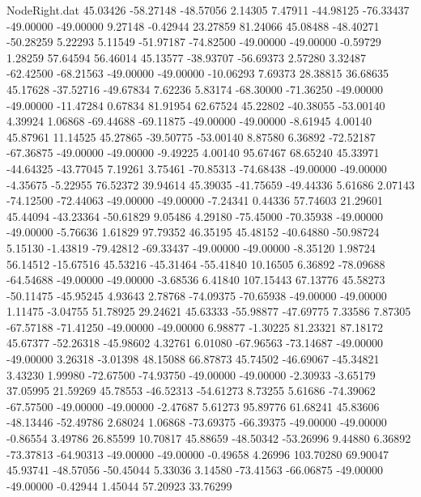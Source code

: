 \begin{filecontents}{NodeRight.dat}
  45.03426  -58.27148  -48.57056     2.14305    7.47911  -44.98125  -76.33437  -49.00000  -49.00000    9.27148   -0.42944   23.27859   81.24066
  45.08488  -48.40271  -50.28259     5.22293    5.11549  -51.97187  -74.82500  -49.00000  -49.00000   -0.59729    1.28259   57.64594   56.46014
  45.13577  -38.93707  -56.69373     2.57280    3.32487  -62.42500  -68.21563  -49.00000  -49.00000  -10.06293    7.69373   28.38815   36.68635
  45.17628  -37.52716  -49.67834     7.62236    5.83174  -68.30000  -71.36250  -49.00000  -49.00000  -11.47284    0.67834   81.91954   62.67524
  45.22802  -40.38055  -53.00140     4.39924    1.06868  -69.44688  -69.11875  -49.00000  -49.00000   -8.61945    4.00140   45.87961   11.14525
  45.27865  -39.50775  -53.00140     8.87580    6.36892  -72.52187  -67.36875  -49.00000  -49.00000   -9.49225    4.00140   95.67467   68.65240
  45.33971  -44.64325  -43.77045     7.19261    3.75461  -70.85313  -74.68438  -49.00000  -49.00000   -4.35675   -5.22955   76.52372   39.94614
  45.39035  -41.75659  -49.44336     5.61686    2.07143  -74.12500  -72.44063  -49.00000  -49.00000   -7.24341    0.44336   57.74603   21.29601
  45.44094  -43.23364  -50.61829     9.05486    4.29180  -75.45000  -70.35938  -49.00000  -49.00000   -5.76636    1.61829   97.79352   46.35195
  45.48152  -40.64880  -50.98724     5.15130   -1.43819  -79.42812  -69.33437  -49.00000  -49.00000   -8.35120    1.98724   56.14512  -15.67516
  45.53216  -45.31464  -55.41840    10.16505    6.36892  -78.09688  -64.54688  -49.00000  -49.00000   -3.68536    6.41840  107.15443   67.13776
  45.58273  -50.11475  -45.95245     4.93643    2.78768  -74.09375  -70.65938  -49.00000  -49.00000    1.11475   -3.04755   51.78925   29.24621
  45.63333  -55.98877  -47.69775     7.33586    7.87305  -67.57188  -71.41250  -49.00000  -49.00000    6.98877   -1.30225   81.23321   87.18172
  45.67377  -52.26318  -45.98602     4.32761    6.01080  -67.96563  -73.14687  -49.00000  -49.00000    3.26318   -3.01398   48.15088   66.87873
  45.74502  -46.69067  -45.34821     3.43230    1.99980  -72.67500  -74.93750  -49.00000  -49.00000   -2.30933   -3.65179   37.05995   21.59269
  45.78553  -46.52313  -54.61273     8.73255    5.61686  -74.39062  -67.57500  -49.00000  -49.00000   -2.47687    5.61273   95.89776   61.68241
  45.83606  -48.13446  -52.49786     2.68024    1.06868  -73.69375  -66.39375  -49.00000  -49.00000   -0.86554    3.49786   26.85599   10.70817
  45.88659  -48.50342  -53.26996     9.44880    6.36892  -73.37813  -64.90313  -49.00000  -49.00000   -0.49658    4.26996  103.70280   69.90047
  45.93741  -48.57056  -50.45044     5.33036    3.14580  -73.41563  -66.06875  -49.00000  -49.00000   -0.42944    1.45044   57.20923   33.76299

\end{filecontents}
